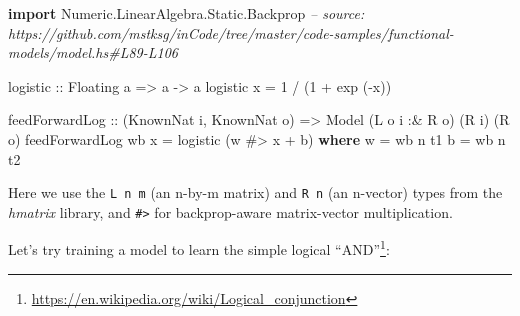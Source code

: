 \documentclass[]{article}
\newenvironment{Shaded}{}{}
\newcommand{\CommentTok}[1]{\textcolor[rgb]{0.38,0.63,0.69}{\textit{#1}}}
\newcommand{\DataTypeTok}[1]{\textcolor[rgb]{0.56,0.13,0.00}{#1}}
\newcommand{\DecValTok}[1]{\textcolor[rgb]{0.25,0.63,0.44}{#1}}
\newcommand{\FunctionTok}[1]{\textcolor[rgb]{0.02,0.16,0.49}{#1}}
\newcommand{\KeywordTok}[1]{\textcolor[rgb]{0.00,0.44,0.13}{\textbf{#1}}}
\newcommand{\NormalTok}[1]{#1}
\newcommand{\OtherTok}[1]{\textcolor[rgb]{0.00,0.44,0.13}{#1}}
\renewcommand{\href}[2]{#2\footnote{\url{#1}}}
\begin{document}
\begin{Shaded}
\begin{Highlighting}[]
\KeywordTok{import} \DataTypeTok{Numeric.LinearAlgebra.Static.Backprop}
\CommentTok{-- source: https://github.com/mstksg/inCode/tree/master/code-samples/functional-models/model.hs#L89-L106}

\OtherTok{logistic ::} \DataTypeTok{Floating}\NormalTok{ a }\OtherTok{=>}\NormalTok{ a }\OtherTok{->}\NormalTok{ a}
\NormalTok{logistic x }\FunctionTok{=} \DecValTok{1} \FunctionTok{/}\NormalTok{ (}\DecValTok{1} \FunctionTok{+}\NormalTok{ exp (}\FunctionTok{-}\NormalTok{x))}

\NormalTok{feedForwardLog}
\OtherTok{    ::}\NormalTok{ (}\DataTypeTok{KnownNat}\NormalTok{ i, }\DataTypeTok{KnownNat}\NormalTok{ o)}
    \OtherTok{=>} \DataTypeTok{Model}\NormalTok{ (}\DataTypeTok{L}\NormalTok{ o i }\FunctionTok{:&} \DataTypeTok{R}\NormalTok{ o) (}\DataTypeTok{R}\NormalTok{ i) (}\DataTypeTok{R}\NormalTok{ o)}
\NormalTok{feedForwardLog wb x }\FunctionTok{=}\NormalTok{ logistic (w }\FunctionTok{#>}\NormalTok{ x }\FunctionTok{+}\NormalTok{ b)}
  \KeywordTok{where}
\NormalTok{    w }\FunctionTok{=}\NormalTok{ wb }\FunctionTok{^^.}\NormalTok{ t1}
\NormalTok{    b }\FunctionTok{=}\NormalTok{ wb }\FunctionTok{^^.}\NormalTok{ t2}
\end{Highlighting}
\end{Shaded}

Here we use the \texttt{L\ n\ m} (an n-by-m matrix) and \texttt{R\ n} (an
n-vector) types from the \emph{hmatrix} library, and \texttt{\#\textgreater{}}
for backprop-aware matrix-vector multiplication.

Let's try training a model to learn the simple
\href{https://en.wikipedia.org/wiki/Logical_conjunction}{logical ``AND''}:

\begin{Shaded}
\end{Shaded}
\end{document}
